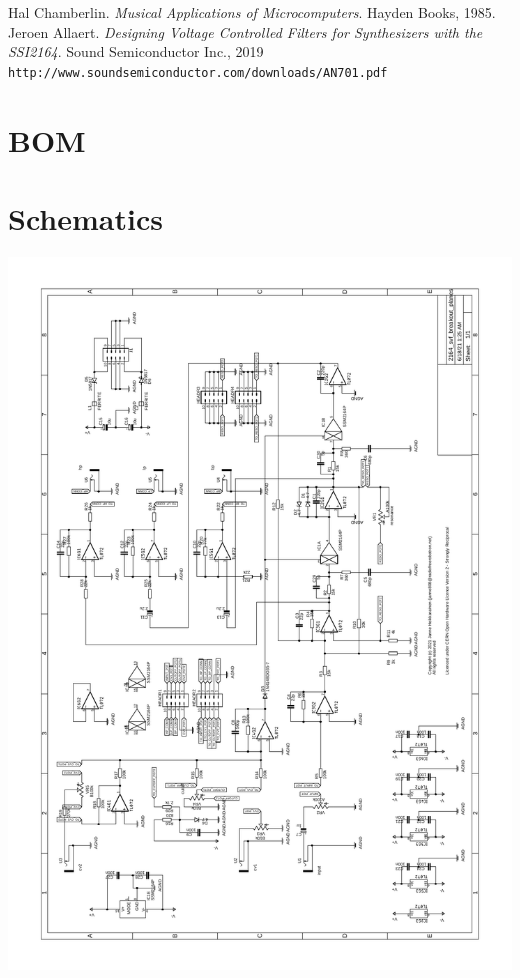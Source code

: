 \documentclass{article}
\begin{document}
\begin{thebibliography}{9}
Hal Chamberlin.
\textit{Musical Applications of Microcomputers}.
Hayden Books, 1985.
Jeroen Allaert.
\textit{Designing Voltage Controlled Filters for Synthesizers with the SSI2164}.
Sound Semiconductor Inc., 2019
\\\texttt{http://www.soundsemiconductor.com/downloads/AN701.pdf}
\end{thebibliography}

\newpage

\appendix

\section{BOM}

\centering
{}

\newpage


\section{Schematics}

\centering
\includegraphics[page=1, scale=0.6]{2164_svf_through-hole_schematic.pdf}
\end{document}
